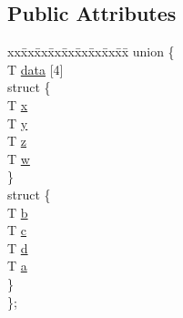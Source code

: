 \subsection*{Public Attributes}
\begin{DoxyCompactItemize}
\item 
\begin{tabbing}
xx\=xx\=xx\=xx\=xx\=xx\=xx\=xx\=xx\=\kill
union \{\\
\>T \hyperlink{structnsquat_aede6e2743bebf9facaa1289538980efe}{data} \mbox{[}4\mbox{]}\\
\>struct \{\\
\>\>T \hyperlink{structnsquat_a22527181ec1041c4866c5ad812a0e59c}{x}\\
\>\>T \hyperlink{structnsquat_aed9d3b4a36de643a497fd4f89ef84559}{y}\\
\>\>T \hyperlink{structnsquat_afc11747164dc0238006ee47af5163ef9}{z}\\
\>\>T \hyperlink{structnsquat_ac7e146c7e356e924c2ceed6067c9b7f8}{w}\\
\>\} \\
\>struct \{\\
\>\>T \hyperlink{structnsquat_a33ec55370f81953af8d55ffafc9e91e6}{b}\\
\>\>T \hyperlink{structnsquat_a5909aaaeec6a21544eecd0791d0ddee9}{c}\\
\>\>T \hyperlink{structnsquat_a482eada816825eb42f642fb3e9fb2f09}{d}\\
\>\>T \hyperlink{structnsquat_a404f51cefb4501a39c360df47c46c8ce}{a}\\
\>\} \\
\}; \\

\end{tabbing}\end{DoxyCompactItemize}


